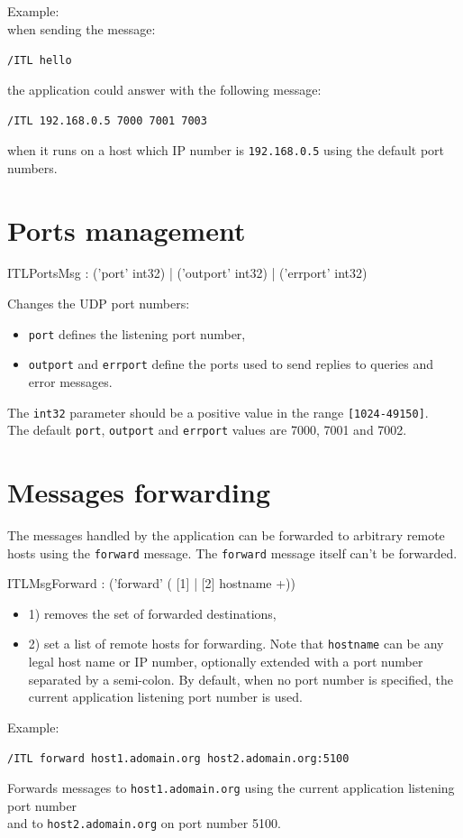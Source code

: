 \documentclass[a4paper,twoside]{report}
\newcommand{\sublevel}[1]	{\section{#1}}
\newcommand{\OSC}[1]		{\texttt{#1}}
\newcommand{\values}[1]	{\texttt{#1}}
\newcommand{\sample}	[1]			{\begin{center}\colorbox{mygrey}{
								\begin{minipage}[t]{0.9\columnwidth} 
								{\small \texttt{#1}}
								\end{minipage}}\end{center}}
\begin{document}
Example:\\
when sending the message:
\sample{/ITL hello}
the application could answer with the following message:
\sample{/ITL 192.168.0.5  7000 7001 7003}
when it runs on a host which IP number is \OSC{192.168.0.5} using the default port numbers.

\sublevel{Ports management}
\label{ITLPorts}

\begin{rail}
ITLPortsMsg : ('port' int32)
		| ('outport' int32)
		| ('errport' int32)
\end{rail}

Changes the UDP port numbers:
\begin{itemize}
\item \OSC{port} defines the listening port number, 
\item \OSC{outport} and \OSC{errport} define the ports used to send replies to queries and error messages. 
\end{itemize}
The \OSC{int32} parameter should be a positive value in the range \values{[1024-49150]}. \\
The default \OSC{port}, \OSC{outport} and \OSC{errport} values are 7000, 7001 and 7002.

\sublevel{Messages forwarding}
\label{ITLForward}

The messages handled by the application can be forwarded to arbitrary remote hosts using the \OSC{forward} message. The \OSC{forward} message itself can't be forwarded. 
 
\begin{rail}
ITLMsgForward : ('forward' ( [1] | [2] hostname +))
\end{rail}

\begin{itemize}

\item 1) removes the set of forwarded destinations,
\item 2) set a list of remote hosts for forwarding. Note that \OSC{hostname} can be any legal host name or IP number, optionally extended with a port number separated by a semi-colon. By default, when no port number is specified, the current application listening port number is used.
\end{itemize}
Example:
\sample{/ITL forward host1.adomain.org host2.adomain.org:5100}
Forwards messages to \OSC{host1.adomain.org} using the current application listening port number \\
and to \OSC{host2.adomain.org} on port number 5100.
\end{document}
